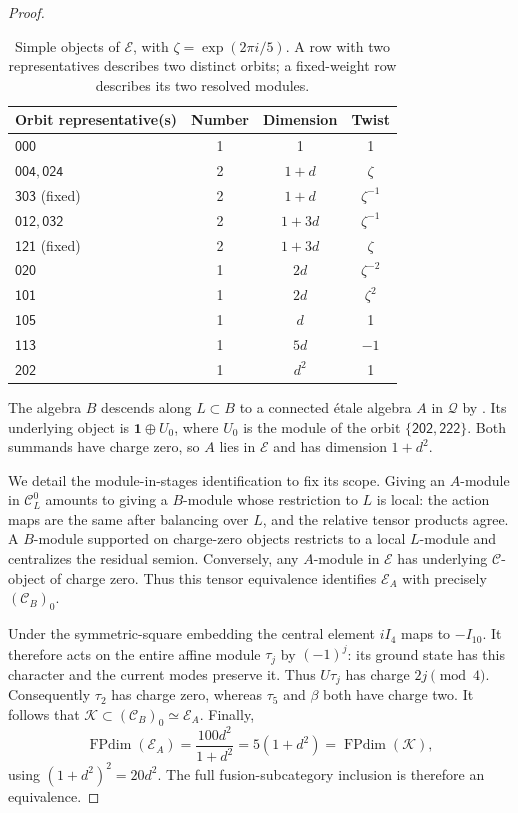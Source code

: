 \documentclass[11pt]{amsart}
\theoremstyle{remark}
\newcommand{\C}{\mathcal C}
\newcommand{\K}{\mathcal K}
\newcommand{\E}{\mathcal E}
\newcommand{\Q}{\mathcal Q}
\newcommand{\FPdim}{\operatorname{FPdim}}
\newcommand{\wt}[1]{\mathsf{#1}}
\newcommand{\one}{\mathbf 1}
\begin{document}
\begin{proof}
\begin{table}[ht]
\centering
\caption{Simple objects of $\E$, with $\zeta=\exp(2\pi i/5)$. A row
with two representatives describes two distinct orbits; a fixed-weight
row describes its two resolved modules.}
\label{tab:fourteen}
\begin{tabular}{@{}lccc@{}}
\toprule
Orbit representative(s)&Number&Dimension&Twist\\
\midrule
$\wt{000}$&1&1&1\\
$\wt{004},\wt{024}$&2&$1+d$&$\zeta$\\
$\wt{303}$ (fixed)&2&$1+d$&$\zeta^{-1}$\\
$\wt{012},\wt{032}$&2&$1+3d$&$\zeta^{-1}$\\
$\wt{121}$ (fixed)&2&$1+3d$&$\zeta$\\
$\wt{020}$&1&$2d$&$\zeta^{-2}$\\
$\wt{101}$&1&$2d$&$\zeta^2$\\
$\wt{105}$&1&$d$&1\\
$\wt{113}$&1&$5d$&$-1$\\
$\wt{202}$&1&$d^2$&1\\
\bottomrule
\end{tabular}
\end{table}

The algebra $B$ descends along $L\subset B$ to a connected \'etale
algebra $A$ in $\Q$ by \cite[Proposition~3.16]{DMNO}. Its underlying
object is $\one\oplus U_0$, where $U_0$ is the module of the orbit
$\{\wt{202},\wt{222}\}$. Both summands have charge zero, so $A$ lies
in $\E$ and has dimension $1+d^2$.

We detail the module-in-stages identification to fix its scope. Giving
an $A$-module in $\C_L^0$ amounts to giving a $B$-module whose restriction
to $L$ is local: the action maps are the same after balancing over $L$,
and the relative tensor products agree. A $B$-module supported on
charge-zero objects restricts to a local $L$-module and centralizes
the residual semion. Conversely, any $A$-module in $\E$ has underlying
$\C$-object of charge zero. Thus this tensor equivalence identifies
$\E_A$ with precisely $(\C_B)_0$.

Under the symmetric-square embedding the central element $iI_4$ maps
to $-I_{10}$. It therefore acts on the entire affine module $\tau_j$
by $(-1)^j$: its ground state has this character and the current modes
preserve it. Thus $U\tau_j$ has charge $2j\pmod4$.
Consequently $\tau_2$ has charge zero, whereas
$\tau_5$ and $\beta$ both have charge two. It follows that
$\K\subset(\C_B)_0\simeq\E_A$. Finally,
\[
 \FPdim(\E_A)=\frac{100d^2}{1+d^2}=5(1+d^2)=\FPdim(\K),
\]
using $(1+d^2)^2=20d^2$. The full fusion-subcategory inclusion is
therefore an equivalence.
\end{proof}
\end{document}
